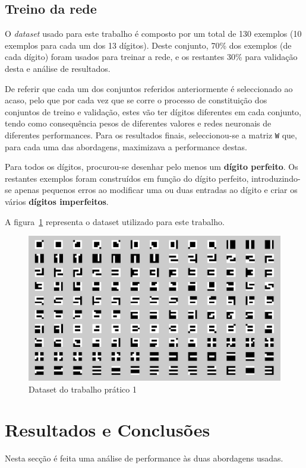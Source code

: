 \documentclass{article}
\begin{document}
\subsection{Treino da rede}
O \textit{dataset} usado para este trabalho é composto por um total de 130 exemplos (10 exemplos para cada um dos 13 dígitos). Deste conjunto, 70\% dos exemplos (de cada dígito) foram usados para treinar a rede, e os restantes 30\% para validação desta e análise de resultados.

De referir que cada um dos conjuntos referidos anteriormente é seleccionado ao acaso, pelo que por cada vez que se corre o processo de constituição dos conjuntos de treino e validação, estes vão ter dígitos diferentes em cada conjunto, tendo como consequência pesos de diferentes valores e redes neuronais de diferentes performances. Para os resultados finais, seleccionou-se a matriz \texttt{W} que, para cada uma das abordagens, maximizava a performance destas.

Para todos os dígitos, procurou-se desenhar pelo menos um \textbf{dígito perfeito}. Os restantes exemplos foram construídos em função do dígito perfeito, introduzindo-se apenas pequenos erros ao modificar uma ou duas entradas ao dígito e criar os vários \textbf{dígitos imperfeitos}.

A figura~\ref{nn_dataset} representa o dataset utilizado para este trabalho.

\begin{figure}[!h]
  \centering
  \includegraphics[width=5in]{figures/nn_dataset}
  \caption{Dataset do trabalho prático 1}
  \label{nn_dataset}
\end{figure}

\clearpage

\section{Resultados e Conclusões}
\indent \indent Nesta secção é feita uma análise de performance às duas abordagens usadas.
\end{document}
